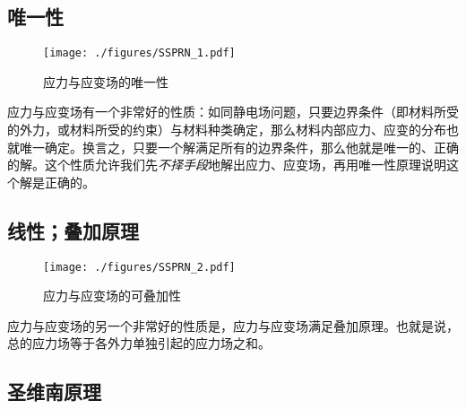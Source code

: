 
\begin{issues}
\issueDraft
\end{issues}

\subsection{唯一性}
\begin{figure}[ht]
\centering
\texttt{[image: ./figures/SSPRN\_1.pdf]}
\caption{应力与应变场的唯一性} \label{SSPRN_fig1}
\end{figure}
应力与应变场有一个非常好的性质：如同静电场问题，只要边界条件（即材料所受的外力，或材料所受的约束）与材料种类确定，那么材料内部应力、应变的分布也就唯一确定。换言之，只要一个解满足所有的边界条件，那么他就是唯一的、正确的解。这个性质允许我们先\textsl{不择手段}地解出应力、应变场，再用唯一性原理说明这个解是正确的。

\subsection{线性；叠加原理}
\begin{figure}[ht]
\centering
\texttt{[image: ./figures/SSPRN\_2.pdf]}
\caption{应力与应变场的可叠加性} \label{SSPRN_fig2}
\end{figure}
应力与应变场的另一个非常好的性质是，应力与应变场满足叠加原理。也就是说，总的应力场等于各外力单独引起的应力场之和。%

\subsection{圣维南原理}
